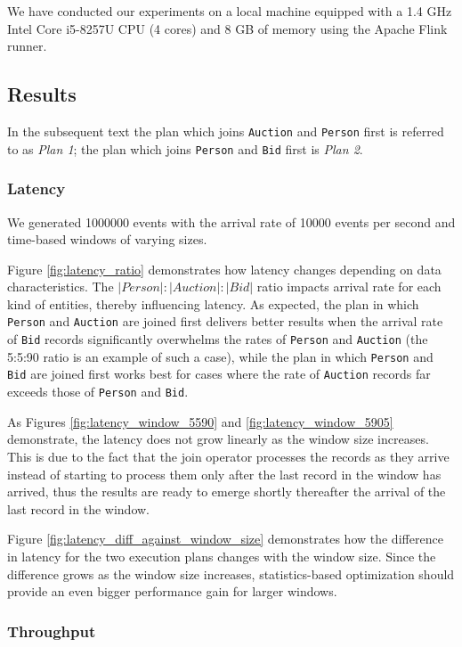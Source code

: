 We have conducted our experiments on a local machine equipped with a 1.4 GHz Intel Core i5-8257U CPU (4 cores) and 8 GB of memory using the Apache Flink runner. 

\subsection{Results}

In the subsequent text the plan which joins \texttt{Auction} and \texttt{Person} first is referred to as \textit{Plan 1}; the plan which joins \texttt{Person} and \texttt{Bid} first is \textit{Plan 2}.
\subsubsection{Latency}

We generated 1000000 events with the arrival rate of 10000 events per second and time-based windows of varying sizes.

Figure \ref{fig:latency_ratio} 
demonstrates how latency changes depending on data characteristics. The $|Person|:|Auction|:|Bid|$ ratio impacts arrival rate for each kind of entities, thereby influencing latency. As expected, the plan in which \texttt{Person} and \texttt{Auction} are joined first delivers better results when the arrival rate of \texttt{Bid} records significantly overwhelms the rates of \texttt{Person} and \texttt{Auction} (the 5:5:90 ratio is an example of such a case), while the plan in which \texttt{Person} and \texttt{Bid} are joined first works best for cases where the rate of \texttt{Auction} records far exceeds those of \texttt{Person} and \texttt{Bid}. 

As Figures \ref{fig:latency_window_5590} and \ref{fig:latency_window_5905} demonstrate, the latency does not grow linearly as the window size increases. This is due to the fact that the join operator processes the records as they arrive instead of starting to process them only after the last record in the window has arrived, thus the results are ready to emerge shortly thereafter the arrival of the last record in the window.

Figure \ref{fig:latency_diff_against_window_size} demonstrates how the difference in latency for the two execution plans changes with the window size. Since the difference grows as the window size increases, statistics-based optimization should provide an even bigger performance gain for larger windows.

\subsubsection{Throughput}

